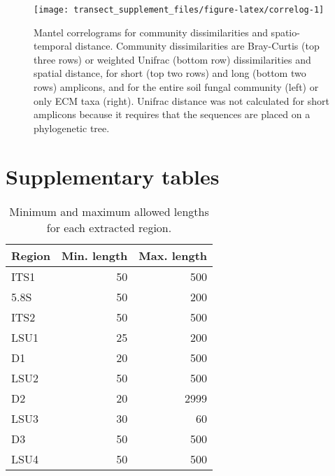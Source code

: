 \documentclass[
]{article}
\begin{document}
\begin{figure}

{\centering \texttt{[image: transect\_supplement\_files/figure-latex/correlog-1]} 

}

\caption[Mantel correlograms for community dissimilarities and spatio-temporal distance]{Mantel correlograms for community dissimilarities and spatio-temporal distance. Community dissimilarities are Bray-Curtis (top three rows) or weighted Unifrac (bottom row) dissimilarities and spatial distance, for short (top two rows) and long (bottom two rows) amplicons, and for the entire soil fungal community (left) or only ECM taxa (right). Unifrac distance was not calculated for short amplicons because it requires that the sequences are placed on a phylogenetic tree.}\label{fig:correlog}
\end{figure}

\FloatBarrier

\hypertarget{supplementary-tables}{%
\section{Supplementary tables}\label{supplementary-tables}}

\listoftables

\newpage

\FloatBarrier

\begin{table}

\caption{\label{tab:region-limits}Minimum and maximum allowed lengths for each extracted region.}
\centering
\begin{tabular}[t]{lrr}
\toprule
Region & Min. length & Max. length\\
\midrule
ITS1 & 50 & 500\\
5.8S & 50 & 200\\
ITS2 & 50 & 500\\
LSU1 & 25 & 200\\
D1 & 20 & 500\\
\addlinespace
LSU2 & 50 & 500\\
D2 & 20 & 2999\\
LSU3 & 30 & 60\\
D3 & 50 & 500\\
LSU4 & 50 & 500\\
\bottomrule
\end{tabular}
\end{table}
\end{document}
